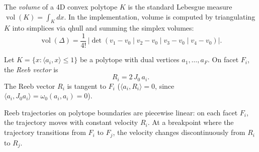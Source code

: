 
\begin{unverified}
\begin{definition}\label{def:volume}
The \emph{volume} of a 4D convex polytope $K$ is the standard
Lebesgue measure $\operatorname{vol}(K) = \int_K dx$.
In the implementation, volume is computed by triangulating $K$
into simplices via qhull and summing the simplex volumes:
\[
  \operatorname{vol}(\Delta)
  = \frac{1}{4!}\, |\det(v_1 - v_0 \mid v_2 - v_0 \mid v_3 - v_0 \mid v_4 - v_0)|.
\]
\end{definition}
\end{unverified}



\begin{unverified}
\begin{definition}\label{def:reeb-vector-field}
Let $K = \{x : \langle a_i, x \rangle \leq 1\}$ be a polytope
with dual vertices $a_1, \ldots, a_F$.
On facet $F_i$, the \emph{Reeb vector} is
\[
  R_i = 2\, J_0\, a_i.
\]
The Reeb vector $R_i$ is tangent to $F_i$
($\langle a_i, R_i \rangle = 0$, since
$\langle a_i, J_0 a_i \rangle = \omega_0(a_i, a_i) = 0$).
\end{definition}
\end{unverified}


\begin{unverified}
\begin{lemma}\label{lem:piecewise-linear-reeb}
Reeb trajectories on polytope boundaries are piecewise linear:
on each facet $F_i$, the trajectory moves with constant velocity $R_i$.
At a breakpoint where the trajectory transitions from $F_i$ to $F_j$,
the velocity changes discontinuously from $R_i$ to $R_j$.
\end{lemma}
\end{unverified}


